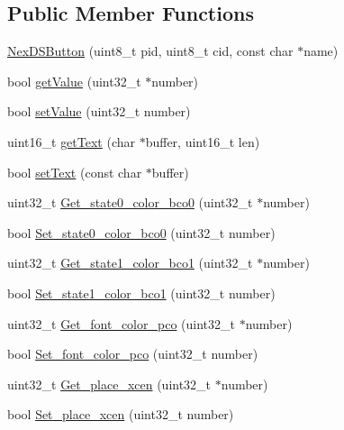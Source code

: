 \subsection*{Public Member Functions}
\begin{DoxyCompactItemize}
\item 
\hyperlink{class_nex_d_s_button_a226edd2467f2fdf54848f5235b808e2b}{Nex\+D\+S\+Button} (uint8\+\_\+t pid, uint8\+\_\+t cid, const char $\ast$name)
\item 
bool \hyperlink{class_nex_d_s_button_a63e08f9a79f326c47aa66e1d0f9648c8}{get\+Value} (uint32\+\_\+t $\ast$number)
\item 
bool \hyperlink{class_nex_d_s_button_a2f696207609e0f01aadebb8b3826b0fa}{set\+Value} (uint32\+\_\+t number)
\item 
uint16\+\_\+t \hyperlink{class_nex_d_s_button_aff0f17061441139bf8797c78e4911eae}{get\+Text} (char $\ast$buffer, uint16\+\_\+t len)
\item 
bool \hyperlink{class_nex_d_s_button_aa7a83123530f2dbb3e6aa909352da5b2}{set\+Text} (const char $\ast$buffer)
\item 
uint32\+\_\+t \hyperlink{class_nex_d_s_button_a57119c8695b1dc562319b19864b68203}{Get\+\_\+state0\+\_\+color\+\_\+bco0} (uint32\+\_\+t $\ast$number)
\item 
bool \hyperlink{class_nex_d_s_button_a7276699c1ea7fccf4e52ad05443b8191}{Set\+\_\+state0\+\_\+color\+\_\+bco0} (uint32\+\_\+t number)
\item 
uint32\+\_\+t \hyperlink{class_nex_d_s_button_aa4ce6ec7a670af2df6bd5858ea20e430}{Get\+\_\+state1\+\_\+color\+\_\+bco1} (uint32\+\_\+t $\ast$number)
\item 
bool \hyperlink{class_nex_d_s_button_a42f31d9e9612d7f8403dcf46ef5e8f1a}{Set\+\_\+state1\+\_\+color\+\_\+bco1} (uint32\+\_\+t number)
\item 
uint32\+\_\+t \hyperlink{class_nex_d_s_button_a01a5a7238547cd761b69c49f1619f955}{Get\+\_\+font\+\_\+color\+\_\+pco} (uint32\+\_\+t $\ast$number)
\item 
bool \hyperlink{class_nex_d_s_button_a25e696769de8d33a3e49db15e0b55aaa}{Set\+\_\+font\+\_\+color\+\_\+pco} (uint32\+\_\+t number)
\item 
uint32\+\_\+t \hyperlink{class_nex_d_s_button_ae65ba8eab275c097fa1f9e7f8873dc5d}{Get\+\_\+place\+\_\+xcen} (uint32\+\_\+t $\ast$number)
\item 
bool \hyperlink{class_nex_d_s_button_a0bc679dfaca7aa0439f67bb91814f97a}{Set\+\_\+place\+\_\+xcen} (uint32\+\_\+t number)
\item 

\end{DoxyCompactItemize}
